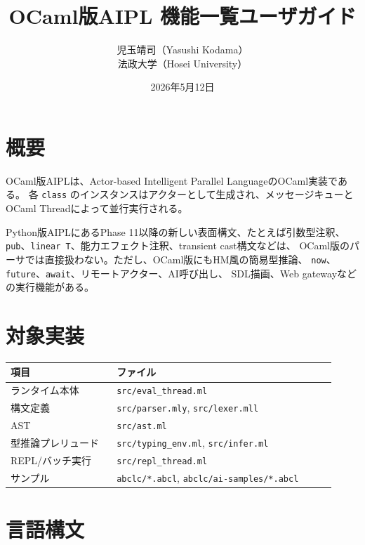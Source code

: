 \documentclass[11pt,a4paper,uplatex,dvipdfmx]{jsarticle}
\title{OCaml版AIPL 機能一覧ユーザガイド}
\author{児玉靖司（Yasushi Kodama）\\法政大学（Hosei University）}
\date{2026年5月12日}
\begin{document}
\maketitle
\tableofcontents
\newpage

\section{概要}

OCaml版AIPLは、Actor-based Intelligent Parallel LanguageのOCaml実装である。
各 \texttt{class} のインスタンスはアクターとして生成され、メッセージキューと
OCaml Threadによって並行実行される。

Python版AIPLにあるPhase 11以降の新しい表面構文、たとえば引数型注釈、
\texttt{pub}、\texttt{linear T}、能力エフェクト注釈、transient cast構文などは、
OCaml版のパーサでは直接扱わない。ただし、OCaml版にもHM風の簡易型推論、
\texttt{now}、\texttt{future}、\texttt{await}、リモートアクター、AI呼び出し、
SDL描画、Web gatewayなどの実行機能がある。

\section{対象実装}

\begin{longtable}{p{0.30\linewidth}p{0.62\linewidth}}
\toprule
項目 & ファイル \\
\midrule
ランタイム本体 & \texttt{src/eval\_thread.ml} \\
構文定義 & \texttt{src/parser.mly}, \texttt{src/lexer.mll} \\
AST & \texttt{src/ast.ml} \\
型推論プレリュード & \texttt{src/typing\_env.ml}, \texttt{src/infer.ml} \\
REPL/バッチ実行 & \texttt{src/repl\_thread.ml} \\
サンプル & \texttt{abclc/*.abcl}, \texttt{abclc/ai-samples/*.abcl} \\
\bottomrule
\end{longtable}

\section{言語構文}
\end{document}
